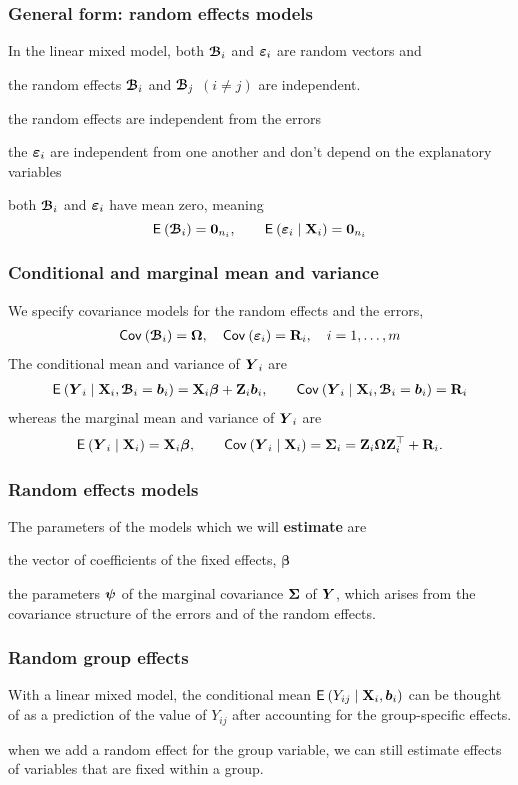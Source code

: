 \documentclass{beamer}
\begin{document}
\begin{frame}
\frametitle{General form: random effects models}
In the linear mixed model, both $\boldsymbol {\mathcal{B}}_i$ and $\boldsymbol {\varepsilon}_i$ are random vectors and 
\bi
\item the random effects $\boldsymbol {\mathcal{B}}_i$ and $\boldsymbol {\mathcal{B}}_j$ $(i \neq j)$ are independent.
\item the random effects are independent from the errors
\item the $\boldsymbol {\varepsilon}_i$ are independent from one another and don't depend on the explanatory variables
\item both $\boldsymbol {\mathcal{B}}_i$ and $\boldsymbol {\varepsilon}_i$ have mean zero, meaning \[{\mathsf E}_{}\left(\boldsymbol {\mathcal{B}}_i\right)=\boldsymbol {0}_{n_i}, \qquad {\mathsf E}_{}\left(\boldsymbol {\varepsilon}_i \mid \mathbf{X}_i\right)=\boldsymbol {0}_{n_i}\]
\ei
\end{frame}
\begin{frame}
\frametitle{Conditional and marginal mean and variance}
We specify covariance models for the random effects and the errors,
\begin{align*}
{\mathsf{Cov}_{}}\left(\boldsymbol {\mathcal{B}}_i\right)=\boldsymbol {\Omega}, \quad {\mathsf{Cov}_{}}\left(\boldsymbol {\varepsilon}_i\right)=\mathbf{R}_i, \quad i=1, \ldots, m
\end{align*}
The \alert{conditional} mean and variance of $\boldsymbol {Y}_i$ are
\begin{align*}
{\mathsf E}_{}\left(\boldsymbol {Y}_i \mid \mathbf{X}_i,\boldsymbol {\mathcal{B}}_i=\boldsymbol {b}_i\right) = \mathbf{X}_i \boldsymbol {\beta} + \mathbf{Z}_i \boldsymbol {b}_i, \qquad {\mathsf{Cov}_{}}\left(\boldsymbol {Y}_i \mid \mathbf{X}_i, \boldsymbol {\mathcal{B}}_i=\boldsymbol {b}_i\right) = \mathbf{R}_i
\end{align*}
whereas the \alert{marginal} mean and variance of $\boldsymbol {Y}_i$ are
\begin{align*}
{\mathsf E}_{}\left(\boldsymbol {Y}_i \mid \mathbf{X}_i\right) = \mathbf{X}_i \boldsymbol {\beta}, \qquad {\mathsf{Cov}_{}}\left(\boldsymbol {Y}_i \mid \mathbf{X}_i\right) = \boldsymbol {\Sigma}_i=\mathbf{Z}_i \boldsymbol {\Omega}\mathbf{Z}_i^\top+\mathbf{R}_i.
\end{align*}
\end{frame}
\begin{frame}[fragile]
\frametitle{Random effects models}
The \alert{parameters} of the models which we will \textbf{estimate} are
\bi \item the vector of coefficients of the fixed effects, $\boldsymbol{\beta}$
\item the parameters $\boldsymbol {\psi}$ of the marginal covariance $\boldsymbol {\Sigma}$ of $\boldsymbol {Y}$, which arises from the covariance structure of the errors and of the random effects.
\ei
\end{frame}
\begin{frame}
\frametitle{Random group effects}
\bi
 \item With a linear mixed model,  the conditional mean ${\mathsf E}_{}\left(Y_{ij}\mid \mathbf{X}_i, \boldsymbol {b}_i\right)$  can be thought of as a \alert{prediction} of the value of $Y_{ij}$ after accounting for the group-specific effects. 
\item when we add a random effect for the group variable, we can still estimate effects of variables that are fixed within a group.
\ei
\end{frame}
\end{document}
